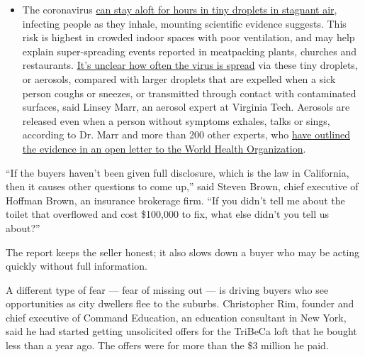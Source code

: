 \begin{itemize}
  \begin{itemize}
  \tightlist
  \item
    The coronavirus
    \href{https://www.nytimes3xbfgragh.onion/2020/07/04/health/239-experts-with-one-big-claim-the-coronavirus-is-airborne.html?action=click\&pgtype=Article\&state=default\&region=MAIN_CONTENT_3\&context=storylines_faq}{can
    stay aloft for hours in tiny droplets in stagnant air}, infecting
    people as they inhale, mounting scientific evidence suggests. This
    risk is highest in crowded indoor spaces with poor ventilation, and
    may help explain super-spreading events reported in meatpacking
    plants, churches and restaurants.
    \href{https://www.nytimes3xbfgragh.onion/2020/07/06/health/coronavirus-airborne-aerosols.html?action=click\&pgtype=Article\&state=default\&region=MAIN_CONTENT_3\&context=storylines_faq}{It's
    unclear how often the virus is spread} via these tiny droplets, or
    aerosols, compared with larger droplets that are expelled when a
    sick person coughs or sneezes, or transmitted through contact with
    contaminated surfaces, said Linsey Marr, an aerosol expert at
    Virginia Tech. Aerosols are released even when a person without
    symptoms exhales, talks or sings, according to Dr. Marr and more
    than 200 other experts, who
    \href{https://academic.oup.com/cid/article/doi/10.1093/cid/ciaa939/5867798}{have
    outlined the evidence in an open letter to the World Health
    Organization}.
  \end{itemize}
\end{itemize}

``If the buyers haven't been given full disclosure, which is the law in
California, then it causes other questions to come up,'' said Steven
Brown, chief executive of Hoffman Brown, an insurance brokerage firm.
``If you didn't tell me about the toilet that overflowed and cost
\$100,000 to fix, what else didn't you tell us about?''

The report keeps the seller honest; it also slows down a buyer who may
be acting quickly without full information.

A different type of fear --- fear of missing out --- is driving buyers
who see opportunities as city dwellers flee to the suburbs. Christopher
Rim, founder and chief executive of Command Education, an education
consultant in New York, said he had started getting unsolicited offers
for the TriBeCa loft that he bought less than a year ago. The offers
were for more than the \$3 million he paid.

